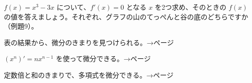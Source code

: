 \bkproblem $f(x)=x^3-3x$ について、$f'(x)=0$ となる $x$ を2つ求め、そのときの $f(x)$ の値を答えましょう。それぞれ、グラフの山のてっぺんと谷の底のどちらですか（例題9）。

\begin{furikaeri}
\begin{checklist}
\item 表の結果から、微分のきまりを見つけられる。\hfill{\footnotesize\sffamily\color{bkTheme}→\pageref{bk:5-4:kimari0}ページ}
\item $(x^n)'=nx^{n-1}$ を使って微分できる。\hfill{\footnotesize\sffamily\color{bkTheme}→\pageref{bk:5-4:kimari}ページ}
\item 定数倍と和のきまりで、多項式を微分できる。\hfill{\footnotesize\sffamily\color{bkTheme}→\pageref{bk:5-4:wa}ページ}
\end{checklist}
\end{furikaeri}

